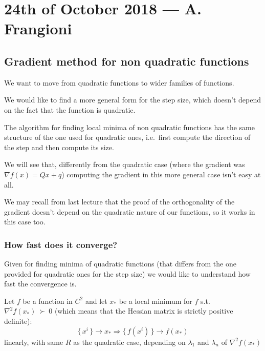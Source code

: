 \documentclass[computationalMathematics.tex]{subfiles}
\begin{document}
\section{24th of October 2018 --- A. Frangioni}

\subsection{Gradient method for non quadratic functions}
We want to move from quadratic functions to wider families of functions.


We would like to find a more general form for the step size, which doesn't depend on the fact that the function is quadratic.

The algorithm for finding local minima of non quadratic functions has the same structure of the one used for quadratic ones, i.e.~first compute the direction of the step and then compute its size.

We will see that, differently from the quadratic case (where the gradient was $\nabla f(x) = Qx + q$) computing the gradient in this more general case isn't easy at all.

We may recall from last lecture that the proof of the orthogonality of the gradient doesn't depend on the quadratic nature of our functions, so it works in this case too.

\subsubsection{How fast does it converge?}
Given  for finding minima of quadratic functions (that differs from the one provided for quadratic ones for the step size) we would like to understand how fast the convergence is.


\begin{theorem}
  Let $f$ be a function in $C^2$ and let $x_*$ be a local minimum for $f$ s.t.~$\nabla^2 f(x_*)~\succ~0$ (which means that the Hessian matrix is strictly positive definite):
       \[
       \{ \, x^i \, \} \to x_*
        \Longrightarrow \{ \, f(x^i) \, \} \to f(x_*)
      \]
        linearly, with same $R$ as the quadratic case, depending on
       $\lambda_1$ and $\lambda_n$ of $\nabla^2 f(x_*)$
\end{theorem}
\end{document}
